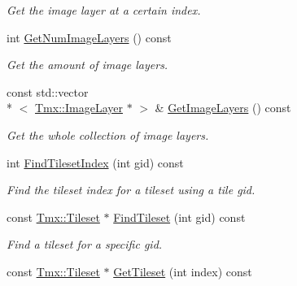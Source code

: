 \begin{DoxyCompactItemize}
\begin{DoxyCompactList}\small\item\em Get the image layer at a certain index. \end{DoxyCompactList}\item 
\hypertarget{classTmx_1_1Map_a3b671ac157c5ff008e031896162dd90b}{int \hyperlink{classTmx_1_1Map_a3b671ac157c5ff008e031896162dd90b}{Get\-Num\-Image\-Layers} () const }\label{classTmx_1_1Map_a3b671ac157c5ff008e031896162dd90b}

\begin{DoxyCompactList}\small\item\em Get the amount of image layers. \end{DoxyCompactList}\item 
\hypertarget{classTmx_1_1Map_a6139d52f06e655609f9b444c681dc82e}{const std\-::vector\\*
$<$ \hyperlink{classTmx_1_1ImageLayer}{Tmx\-::\-Image\-Layer} $\ast$ $>$ \& \hyperlink{classTmx_1_1Map_a6139d52f06e655609f9b444c681dc82e}{Get\-Image\-Layers} () const }\label{classTmx_1_1Map_a6139d52f06e655609f9b444c681dc82e}

\begin{DoxyCompactList}\small\item\em Get the whole collection of image layers. \end{DoxyCompactList}\item 
\hypertarget{classTmx_1_1Map_ae4eaf84225934c655b58dd8777affa57}{int \hyperlink{classTmx_1_1Map_ae4eaf84225934c655b58dd8777affa57}{Find\-Tileset\-Index} (int gid) const }\label{classTmx_1_1Map_ae4eaf84225934c655b58dd8777affa57}

\begin{DoxyCompactList}\small\item\em Find the tileset index for a tileset using a tile gid. \end{DoxyCompactList}\item 
\hypertarget{classTmx_1_1Map_ad6fc54dec9788c9e5875366cfcce7e75}{const \hyperlink{classTmx_1_1Tileset}{Tmx\-::\-Tileset} $\ast$ \hyperlink{classTmx_1_1Map_ad6fc54dec9788c9e5875366cfcce7e75}{Find\-Tileset} (int gid) const }\label{classTmx_1_1Map_ad6fc54dec9788c9e5875366cfcce7e75}

\begin{DoxyCompactList}\small\item\em Find a tileset for a specific gid. \end{DoxyCompactList}\item 
\hypertarget{classTmx_1_1Map_aa2a15a2928afd35d6bdb679e8cf9c1c5}{const \hyperlink{classTmx_1_1Tileset}{Tmx\-::\-Tileset} $\ast$ \hyperlink{classTmx_1_1Map_aa2a15a2928afd35d6bdb679e8cf9c1c5}{Get\-Tileset} (int index) const }\label{classTmx_1_1Map_aa2a15a2928afd35d6bdb679e8cf9c1c5}


\end{DoxyCompactItemize}
